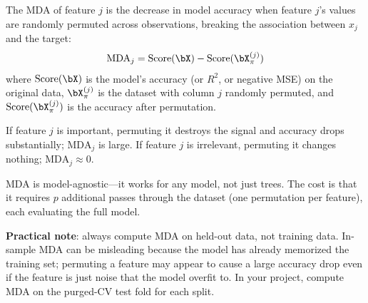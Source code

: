 \begin{definition}
The MDA of feature $j$ is the decrease in model accuracy when feature $j$'s values are randomly permuted across observations, breaking the association between $x_j$ and the target:
\begin{equation}
\mathrm{MDA}_j = \mathrm{Score}(\bX) - \mathrm{Score}(\bX^{(j)}_{\pi})
\label{eq:mda}
\end{equation}
where $\mathrm{Score}(\bX)$ is the model's accuracy (or $R^2$, or negative MSE) on the original data, $\bX^{(j)}_{\pi}$ is the dataset with column $j$ randomly permuted, and $\mathrm{Score}(\bX^{(j)}_{\pi})$ is the accuracy after permutation.
\end{definition}

If feature $j$ is important, permuting it destroys the signal and accuracy drops substantially; $\mathrm{MDA}_j$ is large.
If feature $j$ is irrelevant, permuting it changes nothing; $\mathrm{MDA}_j \approx 0$.

MDA is model-agnostic---it works for any model, not just trees.
The cost is that it requires $p$ additional passes through the dataset (one permutation per feature), each evaluating the full model.

\textbf{Practical note}: always compute MDA on held-out data, not training data.
In-sample MDA can be misleading because the model has already memorized the training set; permuting a feature may appear to cause a large accuracy drop even if the feature is just noise that the model overfit to.
In your project, compute MDA on the purged-CV test fold for each split.


